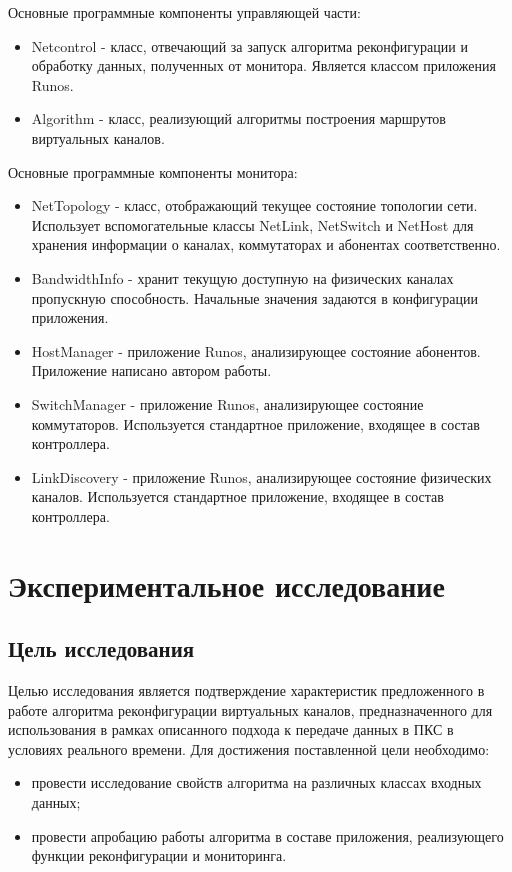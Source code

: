 \documentclass[12pt, a4paper]{article}
\begin{document}
Основные программные компоненты управляющей части:
\begin{itemize}
	\item Netcontrol - класс, отвечающий за запуск алгоритма реконфигурации и обработку данных, полученных от монитора. Является классом приложения Runos.
	\item Algorithm - класс, реализующий алгоритмы построения маршрутов виртуальных каналов.
\end{itemize}

Основные программные компоненты монитора:
\begin{itemize}
	\item NetTopology - класс, отображающий текущее состояние топологии сети. Использует вспомогательные классы NetLink, NetSwitch и NetHost для хранения информации о каналах, коммутаторах и абонентах соответственно.
	\item BandwidthInfo - хранит текущую доступную на физических каналах пропускную способность. Начальные значения задаются в конфигурации приложения.
	\item HostManager - приложение Runos, анализирующее состояние абонентов. Приложение написано автором работы.
	\item SwitchManager - приложение Runos, анализирующее состояние коммутаторов. Используется стандартное приложение, входящее в состав контроллера.
	\item LinkDiscovery - приложение Runos, анализирующее состояние физических каналов. Используется стандартное приложение, входящее в состав контроллера.
\end{itemize}


\section{Экспериментальное исследование}
\subsection{Цель исследования}
Целью исследования является подтверждение характеристик предложенного в работе алгоритма реконфигурации виртуальных каналов, предназначенного для использования в рамках описанного подхода к передаче данных в ПКС в условиях реального времени. Для достижения поставленной цели необходимо:
\begin{itemize}
	\item провести исследование свойств алгоритма на различных классах входных данных; 
	\item провести апробацию работы алгоритма в составе приложения, реализующего функции реконфигурации и мониторинга.
\end{itemize}
\end{document}
